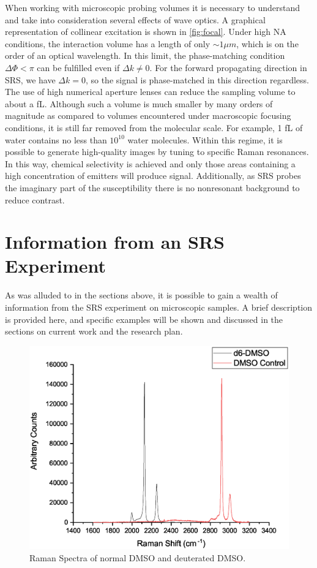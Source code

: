 When working with microscopic probing volumes it is necessary to understand and take into consideration several effects of wave optics. A graphical representation of collinear excitation is shown in \ref{fig:focal}. Under high NA conditions, the interaction volume has a length of only $\sim{1\mu m}$, which is on the order of an optical wavelength. In this limit, the phase-matching condition $\Delta\Phi<\pi$ can be fulfilled even if $\Delta k \neq 0 $. For the forward propagating direction in SRS, we have $\Delta k = 0$, so the signal is phase-matched in this direction regardless. The use of high numerical aperture lenses can reduce the sampling volume to about a fL. Although such a volume is much smaller by many orders of magnitude as compared to volumes encountered under macroscopic focusing conditions, it is still far removed from the molecular scale. For example, 1 fL of water contains no less than $10^10$ water molecules.  Within this regime, it is possible to generate high-quality images by tuning to specific Raman resonances.  In this way, chemical selectivity is achieved and only those areas containing a high concentration of emitters will produce signal.  Additionally, as SRS probes the imaginary part of the susceptibility there is no nonresonant background to reduce contrast.

\section{Information from an SRS Experiment}

As was alluded to in the sections above, it is possible to gain a wealth of information from the SRS experiment on microscopic samples. A brief description is provided here, and specific examples will be shown and discussed in the sections on current work and the research plan.

\begin{figure}[h]
    \centering
    \includegraphics[width=.7\linewidth]{Figures/dmso.eps}
    \caption{Raman Spectra of normal DMSO and deuterated DMSO.}
    \label{fig:spec}
\end{figure}

